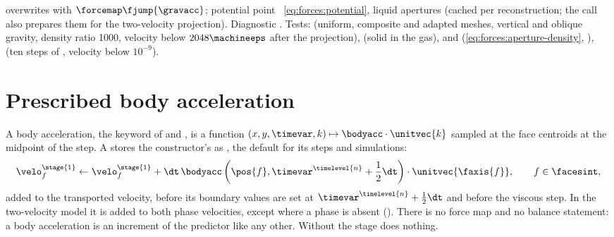 \begin{implnote}
overwrites  with $\forcemap\fjump{\gravacc}$; potential
point ~\cref{eq:forces:potential},
liquid apertures 
(cached per reconstruction; the call also prepares them for the two-velocity
projection). Diagnostic .
Tests: 
(uniform, composite and adapted meshes, vertical and oblique gravity, density
ratio 1000, velocity below $2048\machineeps$ after the projection),
(solid in the gas), 
and 
(\cref{eq:forces:aperture-density}, ),
(ten steps of , velocity below $10^{-9}$).
\end{implnote}

\section{Prescribed body acceleration}\label{sec:forces:body}
A body acceleration, the keyword  of  and
, is a function $(x,y,\timevar,k)\mapsto\bodyacc\cdot\unitvec{k}$
sampled at the face centroids at the midpoint of the step. A
 stores the constructor's  as
, the default for its steps and simulations:
\begin{equation}\label{eq:forces:body}
  \velo^{\stage{1}}_f\leftarrow\velo^{\stage{1}}_f+\dt\,\bodyacc\roundpar{\pos{f},\timevar^{\timelevel{n}}+\half\dt}\cdot\unitvec{\faxis{f}},
  \qquad f\in\facesint,
\end{equation}
added to the transported velocity, before its boundary values are set at
$\timevar^{\timelevel{n}}+\half\dt$ and before the viscous step. In the
two-velocity model it is added to both phase velocities, except where a
phase is absent (). There is no force map and no balance
statement: a body acceleration is an increment of the predictor like any
other. Without  the stage does nothing.


